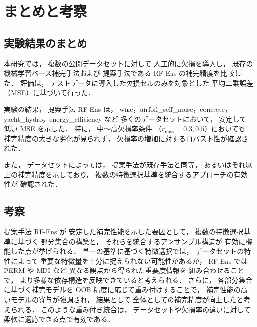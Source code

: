 \section{まとめと考察}

\subsection{実験結果のまとめ}
本研究では，
複数の公開データセットに対して
人工的に欠損を導入し，
既存の機械学習ベース補完手法および
提案手法である RF-Ens の補完精度を比較した．
評価は，
テストデータに導入した欠損セルのみを対象とした
平均二乗誤差（MSE）に基づいて行った．

実験の結果，
提案手法 RF-Ens は，
wine，airfoil\_self\_noise，concrete，
yacht\_hydro，energy\_efficiency など
多くのデータセットにおいて，
安定して低い MSE を示した．
特に，
中〜高欠損率条件
（$r_{\mathrm{miss}} = 0.3, 0.5$）においても
補完精度の大きな劣化が見られず，
欠損率の増加に対するロバスト性が確認された．

また，
データセットによっては，
提案手法が既存手法と同等，
あるいはそれ以上の補完精度を示しており，
複数の特徴選択基準を統合するアプローチの有効性が
確認された．


\subsection{考察}
提案手法 RF-Ens が
安定した補完性能を示した要因として，
複数の特徴選択基準に基づく
部分集合の構築と，
それらを統合するアンサンブル構造が
有効に機能した点が挙げられる．
単一の基準に基づく特徴選択では，
データセットの特性によって
重要な特徴量を十分に捉えられない可能性があるが，
RF-Ens では
PERM や MDI など
異なる観点から得られた重要度情報を
組み合わせることで，
より多様な依存構造を反映できていると考えられる．
さらに，
各部分集合に基づく補完モデルを
OOB 精度に応じて重み付けすることで，
補完性能の高いモデルの寄与が強調され，
結果として
全体としての補完精度が向上したと考えられる．
このような重み付き統合は，
データセットや欠損率の違いに対して
柔軟に適応できる点で有効である．

